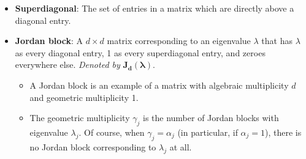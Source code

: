 \documentclass[../notes.tex]{subfiles}
\begin{document}
\begin{itemize}
\begin{itemize}
    \end{itemize}
    \item \textbf{Superdiagonal}: The set of entries in a matrix which are directly above a diagonal entry.
    \item \textbf{Jordan block}: A $d\times d$ matrix corresponding to an eigenvalue $\lambda$ that has $\lambda$ as every diagonal entry, 1 as every superdiagonal entry, and zeroes everywhere else. \emph{Denoted by} $\bm{J_d(\lambda)}$.
    \begin{itemize}
        \item A Jordan block is an example of a matrix with algebraic multiplicity $d$ and geometric multiplicity 1.
        \item The geometric multiplicity $\gamma_j$ is the number of Jordan blocks with eigenvalue $\lambda_j$. Of course, when $\gamma_j=\alpha_j$ (in particular, if $\alpha_j=1$), there is no Jordan block corresponding to $\lambda_j$ at all.
    \end{itemize}

\end{itemize}
\end{document}
